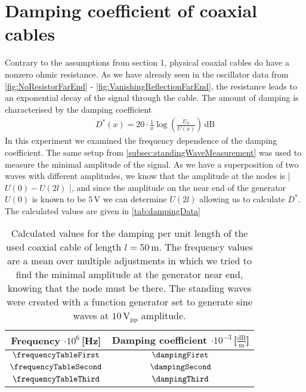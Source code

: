 \documentclass[a4paper,10pt,twocolumn]{article}
\begin{document}
    \section{Damping coefficient of coaxial cables}\label{sec:dampingCoefficient}
    
    Contrary to the assumptions from section 1, physical coaxial cables do have a nonzero ohmic resistance.
    As we have already seen in the oscillator data from \autoref{fig:NoResistorFarEnd} - \autoref{fig:VanishingReflectionFarEnd}, the resistance leads to an exponential decay of the signal through the cable.
    The amount of damping is characterised by the damping coefficient
    \begin{align}
       D^*(x) = 20\cdot \frac{1}{x}\log(\frac{U_0}{U(x)})\,\text{dB} 
    \end{align}
    In this experiment we examined the frequency dependence of the damping coefficient.
    The same setup from \autoref{subsec:standingWaveMeasurement} was used to measure the minimal amplitude of the signal.
    As we have a superposition of two waves with different amplitudes, we know that the amplitude at the nodes is | $U(0) - U(2l)$ |, and since the amplitude on the near end of the generator $U(0)$ is known to be $5\,$V
    we can determine $U(2l)$ allowing us to calculate $D^*$.
    The calculated values are given in \autoref{tab:dampingData}
    \begin{table}
        \centering
        \begin{tabular*}{\linewidth}{@{\extracolsep{\fill}}cc}
    \hline  
    \hline
    \rule[-7pt]{0pt}{23pt}  Frequency $\cdot 10^6\,$[Hz]& Damping coefficient $\cdot 10^{-3}\,$[$\frac{\text{dB}}{\text{m}}$]\\
    \hline
    \rule[-5pt]{0pt}{23pt}  $\frequencyTableFirst$ & $ \dampingFirst $ \\
    \rule[-5pt]{0pt}{23pt}  $\frequencyTableSecond $ & $ \dampingSecond $ \\
    \rule[-5pt]{0pt}{23pt}  $\frequencyTableThird$ & $\dampingThird $ \\
    \hline
    \hline   
        \end{tabular*}
        \caption[]{Calculated values for the damping per unit length of the used coaxial cable of length $l=50\,$m.
        The frequency values are a mean over multiple adjustments in which we tried to find the minimal amplitude at the generator near end,
        knowing that the node must be there.
        The standing waves were created with a function generator set to generate sine waves at $10\,\text{V}_{\text{pp}}$ amplitude.}
        \label{tab:dampingData}
    \end{table}
\end{document}
